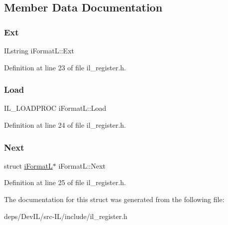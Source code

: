 \subsection{Member Data Documentation}
\mbox{\label{structiFormatL_a99ea0c07caa584255c624d9cd7e6223c}} 
\subsubsection{\texorpdfstring{Ext}{Ext}}
{\footnotesize\ttfamily I\+Lstring i\+Format\+L\+::\+Ext}



Definition at line 23 of file il\+\_\+register.\+h.

\mbox{\label{structiFormatL_afcb9c878fadbefdf8f65a0184afd7b43}} 
\subsubsection{\texorpdfstring{Load}{Load}}
{\footnotesize\ttfamily I\+L\+\_\+\+L\+O\+A\+D\+P\+R\+OC i\+Format\+L\+::\+Load}



Definition at line 24 of file il\+\_\+register.\+h.

\mbox{\label{structiFormatL_a80d700aa471c5391f5165e9ee8a5d497}} 
\subsubsection{\texorpdfstring{Next}{Next}}
{\footnotesize\ttfamily struct \hyperlink{structiFormatL}{i\+FormatL}$\ast$ i\+Format\+L\+::\+Next}



Definition at line 25 of file il\+\_\+register.\+h.



The documentation for this struct was generated from the following file\+:\begin{DoxyCompactItemize}
\item 
deps/\+Dev\+I\+L/src-\/\+I\+L/include/il\+\_\+register.\+h\end{DoxyCompactItemize}
